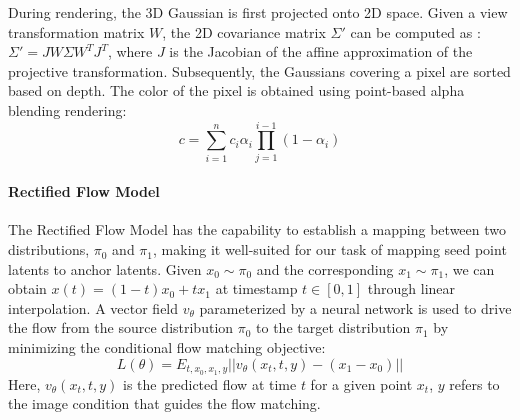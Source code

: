 
During rendering, the 3D Gaussian is first projected onto 2D space. Given a view transformation matrix $W$, the 2D covariance matrix $\Sigma'$ can be computed as :
$\Sigma' = JW\Sigma W^T J^T$, where $J$ is the Jacobian of the affine approximation of the projective transformation. Subsequently, the Gaussians covering a pixel are sorted based on depth. The color of the pixel is obtained using point-based alpha blending rendering:
\begin{equation}
  c = \sum_{i=1}^n c_i \alpha_i \prod_{j=1}^{i-1}(1-\alpha_i)
  \label{3dgs_render}
\end{equation}

\paragraph{Rectified Flow Model}
The Rectified Flow Model \cite{liu2022flow, lipman2022flow} has the capability to establish a mapping between two distributions, \( \pi_0 \) and \( \pi_1 \), making it well-suited for our task of mapping seed point latents to anchor latents. Given \( x_0 \sim \pi_0 \) and the corresponding \( x_1 \sim \pi_1 \), we can obtain \( x(t) = (1 - t) x_0 + t x_1 \) at timestamp \( t \in [0,1]\) through linear interpolation. A vector field \( v_{\theta} \) parameterized by a neural network is used to drive the flow from the source distribution \( \pi_0 \) to the target distribution \( \pi_1 \) by minimizing the conditional flow matching objective:
\begin{equation}
    L(\theta) = E_{t,x_0,x_1,y}||v_{\theta}(x_t, t,y) - (x_1 - x_0)||
    \label{eq:flow matching}
\end{equation}
Here, $v_{\theta}(x_t, t, y)$ is the predicted flow at time $t$ for a given point $x_t$, $y$ refers to the image  condition that guides the flow matching.